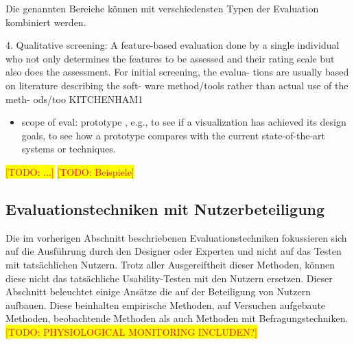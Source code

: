 \documentclass[draft=false
              ,paper=a4
              ,twoside=false
              ,fontsize=11pt
              ,headsepline
              ,BCOR10mm
              ,DIV11
              ]{scrbook}
\newcommand{\TODO}[1]{\colorbox{yellow}{\textcolor{red}{[TODO: #1]}}}
\begin{document}
Die genannten Bereiche können mit verschiedensten Typen der Evaluation kombiniert werden.

4. Qualitative screening: A feature-based evaluation done by a  single individual who not only determines the features to be assessed and their rating scale but also does the assessment. For  initial screening, the evalua- tions are usually based  on literature describing the soft- ware method/tools rather than actual use of the meth- ods/too KITCHENHAM1

\begin{itemize}
  \item scope of eval: prototype , e.g., to see if a visualization has achieved
its design goals, to see how a prototype compares with
the current state-of-the-art systems or techniques.
\end{itemize}
\TODO{...}
\TODO{Beispiele}
\fi %

\subsection{Evaluationstechniken mit Nutzerbeteiligung} %
\label{sub:evaluationstechniken_mit_nutzerbeteiligung}
Die im vorherigen Abschnitt beschriebenen Evaluationstechniken fokussieren sich auf die Ausführung durch den Designer oder Experten und nicht auf das Testen mit tatsächlichen Nutzern. Trotz aller Ausgereiftheit dieser Methoden, können diese nicht das tatsächliche Usability-Testen mit den Nutzern ersetzen. Dieser Abschnitt beleuchtet einige Ansätze die auf der Beteiligung von Nutzern aufbauen. Diese beinhalten empirische Methoden, auf Versuchen aufgebaute Methoden, beobachtende Methoden als auch Methoden mit Befragungstechniken. \TODO{PHYSIOLOGICAL MONITORING INCLUDEN?}
\end{document}
